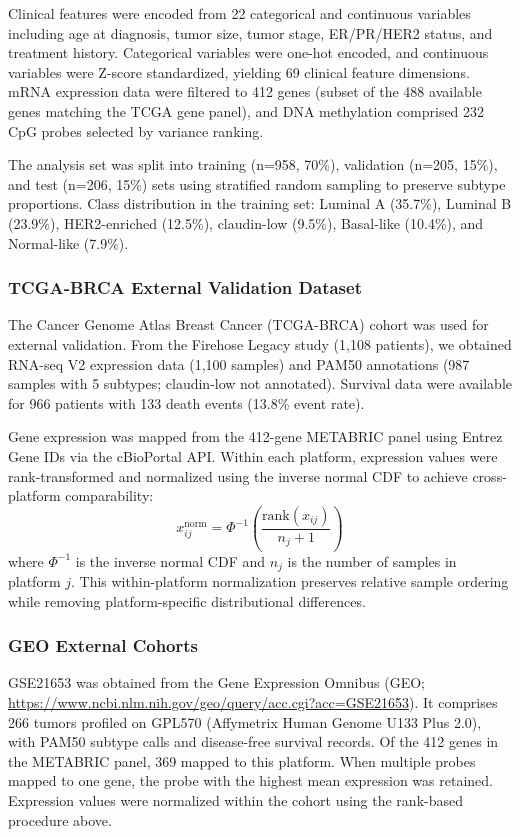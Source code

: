 \documentclass[11pt,a4paper]{article}
\begin{document}
Clinical features were encoded from 22 categorical and continuous variables including age at diagnosis, tumor size, tumor stage, ER/PR/HER2 status, and treatment history. Categorical variables were one-hot encoded, and continuous variables were Z-score standardized, yielding 69 clinical feature dimensions. mRNA expression data were filtered to 412 genes (subset of the 488 available genes matching the TCGA gene panel), and DNA methylation comprised 232 CpG probes selected by variance ranking.

The analysis set was split into training (n=958, 70\%), validation (n=205, 15\%), and test (n=206, 15\%) sets using stratified random sampling to preserve subtype proportions. Class distribution in the training set: Luminal A (35.7\%), Luminal B (23.9\%), HER2-enriched (12.5\%), claudin-low (9.5\%), Basal-like (10.4\%), and Normal-like (7.9\%).

\subsubsection{TCGA-BRCA External Validation Dataset}
The Cancer Genome Atlas Breast Cancer (TCGA-BRCA) cohort \citep{cancer2012comprehensive} was used for external validation. From the Firehose Legacy study (1,108 patients), we obtained RNA-seq V2 expression data (1,100 samples) and PAM50 annotations (987 samples with 5 subtypes; claudin-low not annotated). Survival data were available for 966 patients with 133 death events (13.8\% event rate).

Gene expression was mapped from the 412-gene METABRIC panel using Entrez Gene IDs via the cBioPortal API. Within each platform, expression values were rank-transformed and normalized using the inverse normal CDF to achieve cross-platform comparability:
\begin{equation}
  x_{ij}^{\text{norm}} = \Phi^{-1}\left(\frac{\text{rank}(x_{ij})}{n_j + 1}\right)
  \label{eq:rank_norm}
\end{equation}
where $\Phi^{-1}$ is the inverse normal CDF and $n_j$ is the number of samples in platform $j$. This within-platform normalization preserves relative sample ordering while removing platform-specific distributional differences.

\subsubsection{GEO External Cohorts}
GSE21653 was obtained from the Gene Expression Omnibus (GEO; \url{https://www.ncbi.nlm.nih.gov/geo/query/acc.cgi?acc=GSE21653}). It comprises 266 tumors profiled on GPL570 (Affymetrix Human Genome U133 Plus 2.0), with PAM50 subtype calls and disease-free survival records. Of the 412 genes in the METABRIC panel, 369 mapped to this platform. When multiple probes mapped to one gene, the probe with the highest mean expression was retained. Expression values were normalized within the cohort using the rank-based procedure above.
\end{document}
